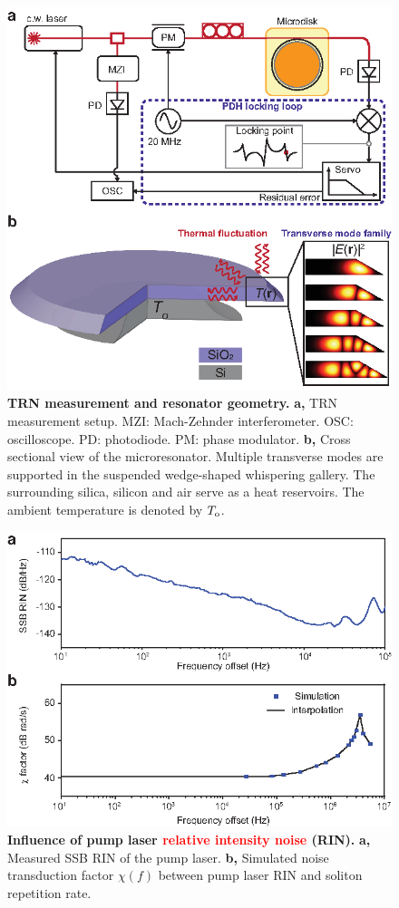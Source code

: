 \documentclass[noshowpacs,amsmath,
twocolumn,
superscriptaddress,
8pt,
aps,prb]{revtex4-2}
\begin{document}
\begin{figure}
\centering
\includegraphics[width=\linewidth]{Fig7.eps}
\caption{{\bf TRN measurement and resonator geometry.} {\bf a,} TRN measurement setup. MZI: Mach-Zehnder interferometer. OSC: oscilloscope. PD: photodiode. PM: phase modulator. {\bf b,} Cross sectional view of the microresonator. Multiple transverse modes are supported in the  suspended wedge-shaped whispering gallery. The surrounding silica, silicon and air serve as a heat reservoirs. The ambient temperature is denoted by $T_{\rm o}$. }
\label{figure7}
\end{figure}

\begin{figure}[t]
\centering
\includegraphics[width=\linewidth]{Fig8.eps}
\caption{{\bf Influence of pump laser \textcolor{red}{relative intensity noise} (RIN). } {\bf a,} Measured SSB RIN of the pump laser. {\bf b,} Simulated noise transduction factor $\chi(f)$ between pump laser RIN and soliton repetition rate.}
\label{figure8}
\end{figure}
\end{document}

